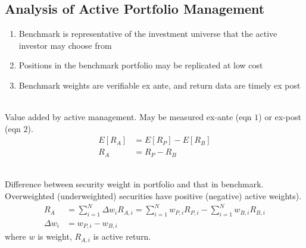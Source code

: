 \subsection{Analysis of Active Portfolio Management}

\begin{remark} 
\begin{enumerate}[label=\roman*.]
\setlength{\itemsep}{0pt}
\item Benchmark is representative of the investment universe that the active investor may choose from
\item Positions in the benchmark portfolio may be replicated at low cost
\item Benchmark weights are verifiable ex ante, and return data are timely ex post
\end{enumerate}
\end{remark}

\begin{definition} \\
Value added by active management. May be measured ex-ante (eqn $1$) or ex-post (eqn $2$).
\begin{align}
E[R_A] &= E[R_P] - E[R_B] \nonumber \\
R_A &= R_P - R_B \nonumber
\end{align}
\end{definition}

\begin{definition} \\
Difference between security weight in portfolio and that in benchmark.\\
Overweighted (underweighted) securities have positive (negative) active weights).
\begin{align}
R_A &= \sum\limits_{i=1}^N \Delta w_i R_{A,i} = \sum\limits_{i=1}^N w_{P,i} R_{P,i} - \sum\limits_{i=1}^N w_{B,i} R_{B,i}  \nonumber \\
\Delta w_i &= w_{P,i} - w_{B,i} \nonumber
\end{align}
where $w$ is weight, $R_{A,i}$ is active return.
\end{definition}

